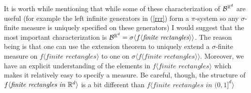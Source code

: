 \documentclass[10pt,letterpaper,twocolumn]{article}
\newtheorem{example}{Example}
\newtheorem{exercise}{Exercise}
\begin{document}
It is worth while mentioning that while some of these characterization of $\mathcal B^{\Bbb R^d}$ are useful (for example the left infinite generators in (\ref{rrr}) form a $\pi$-system so any $\sigma$-finite measure is uniquely specified on these generators) I would suggest that the most important characterization is $\mathcal B^{\Bbb R^d}=\sigma \langle f\langle \textit{finite rectangles} \rangle\rangle$. The reason being is that one can use the extension theorem to uniquely extend a $\sigma$-finite measure on $f\langle  \textit{finite rectangles} \rangle$ to one on $\sigma \langle f\langle  \textit{finite rectangles} \rangle\rangle$. Moreover, we have an explicit understanding of the elements in $f\langle  \textit{finite rectangles} \rangle$ which makes it relatively easy to specify a measure.  Be careful, though, the structure of $f\langle \textit{finite rectangles in $\Bbb R^d$}\rangle$ is a bit different than $f\langle \textit{finite rectangles in $(0,1]^d$}\rangle$
%
%
%
%
%
%
%
\end{document}
